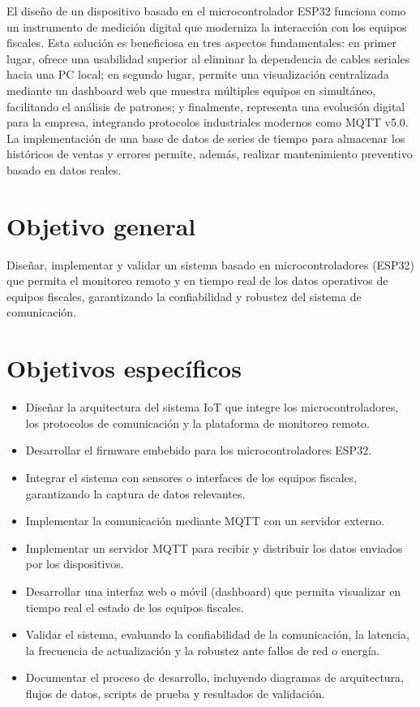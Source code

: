 El diseño de un dispositivo basado en el microcontrolador ESP32 funciona como un instrumento de medición digital que moderniza la interacción con los equipos fiscales. Esta solución es beneficiosa en tres aspectos fundamentales: en primer lugar, ofrece una usabilidad superior al eliminar la dependencia de cables seriales hacia una PC local; en segundo lugar, permite una visualización centralizada mediante un dashboard web que muestra múltiples equipos en simultáneo, facilitando el análisis de patrones; y finalmente, representa una evolución digital para la empresa, integrando protocolos industriales modernos como MQTT v5.0. La implementación de una base de datos de series de tiempo para almacenar los históricos de ventas y errores permite, además, realizar mantenimiento preventivo basado en datos reales.

\section*{Objetivo general}

Diseñar, implementar y validar un sistema basado en microcontroladores (ESP32) que permita el monitoreo remoto y en tiempo real de los datos operativos de equipos fiscales, garantizando la confiabilidad y robustez del sistema de comunicación.

\section*{Objetivos espec\'ificos}

\begin{itemize}
    \item Diseñar la arquitectura del sistema IoT que integre los microcontroladores, los protocolos de comunicación y la plataforma de monitoreo remoto.
    \item Desarrollar el firmware embebido para los microcontroladores ESP32.
    \item Integrar el sistema con sensores o interfaces de los equipos fiscales, garantizando la captura de datos relevantes.
    \item Implementar la comunicación mediante MQTT con un servidor externo.
    \item Implementar un servidor MQTT para recibir y distribuir los datos enviados por los dispositivos.
    \item Desarrollar una interfaz web o móvil (dashboard) que permita visualizar en tiempo real el estado de los equipos fiscales.
    \item Validar el sistema, evaluando la confiabilidad de la comunicación, la latencia, la frecuencia de actualización y la robustez ante fallos de red o energía.
    \item Documentar el proceso de desarrollo, incluyendo diagramas de arquitectura, flujos de datos, scripts de prueba y resultados de validación.
\end{itemize}
